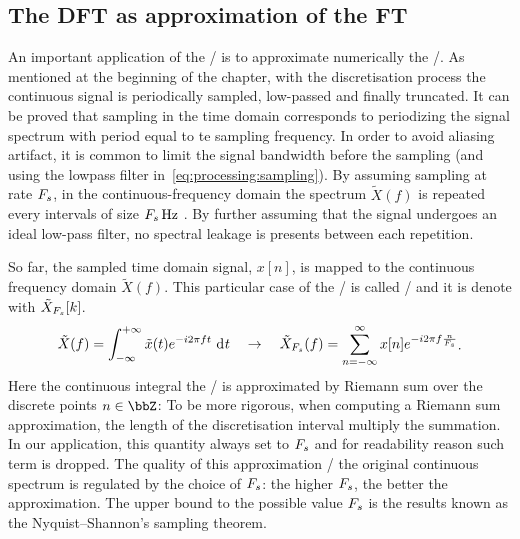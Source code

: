 \subsection{The DFT as approximation of the FT}\label{subsec:processing:ftapprox}
An important application of the \DFT/ is to approximate numerically the \FT/.
As mentioned at the beginning of the chapter, with the discretisation process the continuous signal is periodically sampled, low-passed and finally truncated.
It can be proved that sampling in the time domain corresponds to periodizing the signal spectrum with period equal to te sampling frequency.
In order to avoid aliasing artifact, it is common to limit the signal bandwidth before the sampling (and using the lowpass filter in~\cref{eq:processing:sampling}).
By assuming sampling at rate $F_s$, in the continuous-frequency domain the spectrum $\tilde{X}(f)$ is repeated every intervals of size $\Fs\,\si{\Hz}$ .
By further assuming that the signal undergoes an ideal low-pass filter, no spectral leakage is presents between each repetition.

\mynewline
So far, the sampled time domain signal, $x[n]$, is mapped to the continuous frequency domain $\tilde{X}(f)$.
This particular case of the \FT/ is called \DTFTdef/ and it is denote with $\tilde{X}_{F_s}[ k]$.
\begin{equation}\label{eq:processing:ft2dtft}
    \begin{aligned}
        \tilde{X}(f) =
        \int_{-\infty}^{+\infty}
        \tilde{x}(t)
        \cste^{-\csti 2 \pi f t}
        \,\kdiff{t}
        \quad \rightarrow \quad
        \tilde{X}_{\Fs}( f) =
        \sum_{n = -\infty}^{\infty}
        x[ n]
        \cste^{-\csti2\pi f \frac{n}{\Fs}}
    \end{aligned}
    .
\end{equation}
Here the continuous integral the \FT/ is approximated by Riemann sum over the discrete points $n \in \Z$:
To be more rigorous, when computing a Riemann sum approximation, the length of the discretisation interval multiply the summation.
In our application, this quantity always set to $F_s$ and for readability reason such term is dropped.
The quality of this approximation \wrt/ the original continuous spectrum is regulated by the choice of $F_s$: the higher $F_s$, the better the approximation.
The upper bound to the possible value $F_s$ is the results known as the Nyquist–Shannon's sampling theorem.

